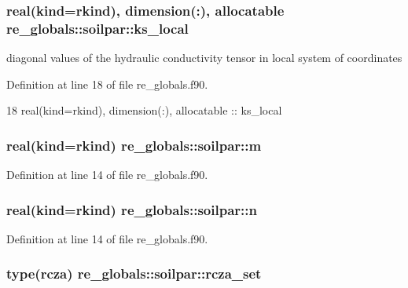 \subsubsection[{ks\+\_\+local}]{\setlength{\rightskip}{0pt plus 5cm}real(kind=rkind), dimension(\+:), allocatable re\+\_\+globals\+::soilpar\+::ks\+\_\+local}\label{structre__globals_1_1soilpar_a19a9adb0c72a2fd75fdf5ab715e73c26}


diagonal values of the hydraulic conductivity tensor in local system of coordinates 



Definition at line 18 of file re\+\_\+globals.\+f90.


\begin{DoxyCode}
18     \textcolor{keywordtype}{real(kind=rkind)}, \textcolor{keywordtype}{dimension(:)}, \textcolor{keywordtype}{allocatable}   :: ks\_local
\end{DoxyCode}
\subsubsection[{m}]{\setlength{\rightskip}{0pt plus 5cm}real(kind=rkind) re\+\_\+globals\+::soilpar\+::m}\label{structre__globals_1_1soilpar_a5f33b1d39a40230c732d263ab9b433de}


Definition at line 14 of file re\+\_\+globals.\+f90.

\subsubsection[{n}]{\setlength{\rightskip}{0pt plus 5cm}real(kind=rkind) re\+\_\+globals\+::soilpar\+::n}\label{structre__globals_1_1soilpar_ae7b7f4552600f21189665e283b1bc592}


Definition at line 14 of file re\+\_\+globals.\+f90.

\subsubsection[{rcza\+\_\+set}]{\setlength{\rightskip}{0pt plus 5cm}type({\bf rcza}) re\+\_\+globals\+::soilpar\+::rcza\+\_\+set}\label{structre__globals_1_1soilpar_a40077bbfc9e48c1bcca4f4f791b67938}


